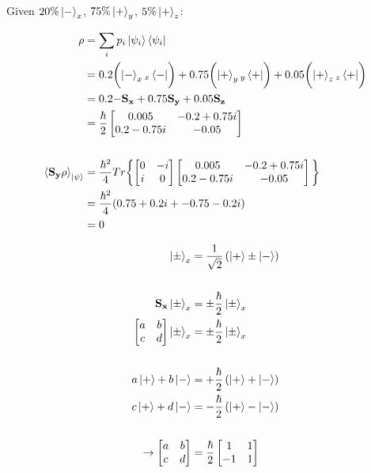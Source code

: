 \documentclass[12pt]{article}
\begin{document}
\newpage
\problem

Given $20\% \Ket{-}_x$, $75\% \Ket{+}_y$, $5\% \Ket{+}_z$:

\begin{align*}
    \rho &= \sum_i p_i \Ket{\psi_i}\Bra{\psi_i} \\
         &= 0.2 
    \biggl( \Ket{-}_x 
    {}_x\Bra{-} \biggr)
 + 0.75 
    \biggl( \Ket{+}_y 
    {}_y\Bra{+} \biggr)
 + 0.05 
    \biggl( \Ket{+}_z 
    {}_z\Bra{+} \biggr)
 \\
         &= 0.2 \mathbf{-S_x} + 0.75 \mathbf{S_y} + 0.05 \mathbf{S_z} \\
         &= \frac{\hbar}{2} \begin{bmatrix}
    0.005 & -0.2 + 0.75i \\
    0.2 - 0.75i & -0.05
\end{bmatrix} \\ \\
    \Braket{\mathbf{S_y}\rho}_{\Ket{\psi}} &= \frac{\hbar^2}{4}Tr\biggl\{
\begin{bmatrix}
    0 & -i \\
    i & 0
\end{bmatrix}
\begin{bmatrix}
    0.005 & -0.2 + 0.75i \\
    0.2 - 0.75i & -0.05
\end{bmatrix}
    \biggl\} \\
    &= \frac{\hbar^2}{4} (0.75 + 0.2i + -0.75 -0.2i) \\
    &= 0
\end{align*}



\problem
\begin{align*}
    \Ket{\pm}_x &= \frac{1}{\sqrt{2}} \left(\Ket{+} \pm \Ket{-}\right) \\ \\
    \mathbf{S_x} \Ket{\pm}_x &= \pm\frac{\hbar}{2} \Ket{\pm}_x \\
    \begin{bmatrix}
        a & b \\
        c & d
    \end{bmatrix} \Ket{\pm}_x &= \pm\frac{\hbar}{2} \Ket{\pm}_x \\ \\
        a\Ket{+} + b\Ket{-} &= +\frac{\hbar}{2} \left(\Ket{+} + \Ket{-}\right) \\ 
        c\Ket{+} + d\Ket{-} &= -\frac{\hbar}{2} \left(\Ket{+} - \Ket{-}\right) \\ \\
        \to 
    \begin{bmatrix}
        a & b \\
        c & d
    \end{bmatrix} &= 
    \frac{\hbar}{2}
    \begin{bmatrix}
        1 & 1 \\
        -1 & 1
    \end{bmatrix}
\end{align*}
\end{document}
